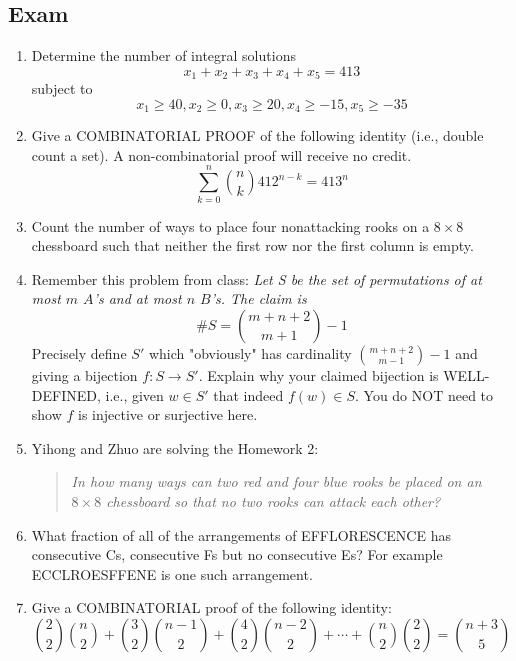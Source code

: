 \documentclass{report}
\begin{document}
{\subsection*{Exam}

\begin{enumerate}
    \item Determine the number of integral solutions
          $$x_1 + x_2 + x_3 + x_4 + x_5 = 413$$ subject to
          $$x_1 \ge 40, x_2 \ge 0, x_3 \ge 20, x_4 \ge -15, x_5 \ge -35$$

    \item Give a COMBINATORIAL PROOF of the following identity (i.e.,
          double count a set). A non-combinatorial proof will receive no credit.
          $$\sum_{k=0}^n \binom{n}{k} 412^{n-k} = 413^n$$

    \item Count the number of ways to place four nonattacking rooks on a
          $8 \times 8$ chessboard such that neither the first row nor the first column is
          empty.

    \item Remember this problem from class: \textit{Let S be the set of permutations
              of at most $m$ $A$'s and at most $n$ $B$'s. The claim is}
          $$\#S = \binom{m+n+2}{m+1}-1 $$ Precisely define $S'$ which
          "obviously" has cardinality $\binom{m+n+2}{m-1}-1$ and giving a
          bijection $f: S \to S'$. Explain why your claimed bijection is
          WELL-DEFINED, i.e., given $w \in S'$ that indeed $f(w) \in S$.
          You do NOT need to show $f$ is injective or surjective here.

    \item Yihong and Zhuo are solving the Homework 2:

          \begin{quotation}
              \textit{In how many ways can two red and four blue rooks be
                  placed on an $8 \times 8$ chessboard so that no two rooks can
                  attack each other?}
          \end{quotation}

    \item What fraction of all of the arrangements of EFFLORESCENCE has
          consecutive Cs, consecutive Fs but no consecutive Es? For example
          ECCLROESFFENE is one such arrangement.

    \item Give a COMBINATORIAL proof of the following identity:
          $$\binom{2}{2}\binom{n}{2} + \binom{3}{2} \binom{n-1}{2} + \binom{4}{2}\binom{n-2}{2} + \cdots + \binom{n}{2} \binom{2}{2}=\binom{n+3}{5}$$
\end{enumerate}

}
\end{document}
